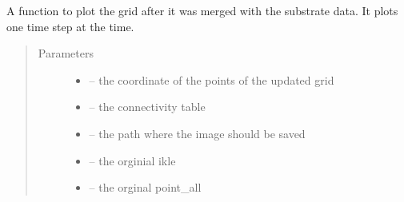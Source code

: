 \documentclass[letterpaper,10pt,english]{sphinxmanual}
\begin{document}
\begin{fulllineitems}
\label{\detokenize{index:src.substrate.fig_merge_grid}}
A function to plot the grid after it was merged with the substrate data.
It plots one time step at the time.
\begin{quote}\begin{description}
\item[{Parameters}] \leavevmode\begin{itemize}
\item {} 
 -- the coordinate of the points of the updated grid

\item {} 
 -- the connectivity table

\item {} 
 -- the path where the image should be saved

\item {} 
 -- the orginial ikle

\item {} 
 -- the orginal point\_all

\end{itemize}

\end{description}\end{quote}

\end{fulllineitems}

\end{document}
